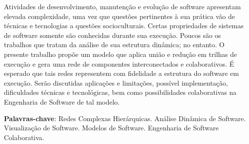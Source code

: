 
%
%

\begin{resumo}
    Atividades de desenvolvimento, manutenção e evolução de software apresentam
    elevada complexidade, uma vez que questões pertinentes à sua prática vão de
    técnicas e tecnologias a questões socioculturais. Certas propriedades de
    sistemas de software somente são conhecidas durante sua execução. Poucos são
    os trabalhos que tratam da análise de sua estrutura dinâmica; no entanto. O
    presente trabalho propõe um modelo que aplica união e redução em trilhas de
    execução e gera uma rede de componentes interconectados e colaborativos. É
    esperado que tais redes representem com fidelidade a estrutura do software
    em execução. Serão discutidas aplicações e limitações, possível
    implementação, dificuldades técnicas e tecnológicas, bem como possibilidades
    colaborativas na Engenharia de Software de tal modelo.

    \textbf{Palavras-chave}: Redes Complexas Hierárquicas.
    Análise Dinâmica de Software. Visualização de Software. Modelos de Software.
    Engenharia de Software Colaborativa.
\end{resumo}
